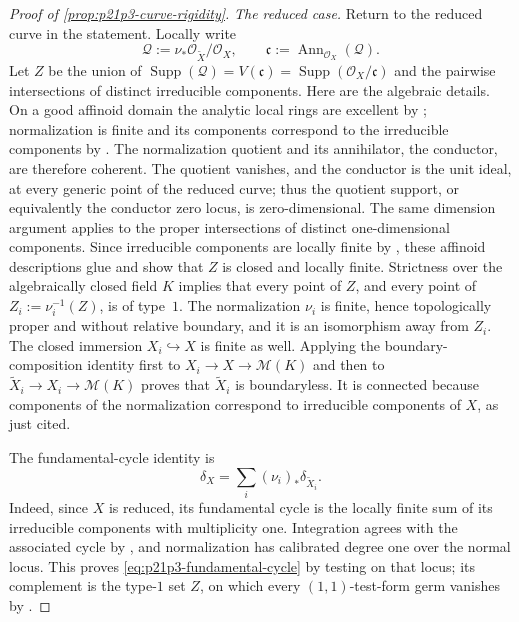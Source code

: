 \begin{proof}[Proof of \cref{prop:p21p3-curve-rigidity}]
\smallskip
\emph{The reduced case.}
Return to the reduced curve in the statement.  Locally write
\[
 \mathcal Q:=\nu_*\mathcal O_{\widetilde X}/\mathcal O_X,
 \qquad
 \mathfrak c:=\operatorname{Ann}_{\mathcal O_X}(\mathcal Q).
\]
Let \(Z\) be the union of
\(\operatorname{Supp}(\mathcal Q)=V(\mathfrak c)
=\operatorname{Supp}(\mathcal O_X/\mathfrak c)\) and the pairwise
intersections of distinct irreducible components.  Here are the algebraic
details.  On a good affinoid domain the analytic local rings are excellent
by \cite[\S11.1.10]{CLD25}; normalization is finite and its components
correspond to the irreducible components by
\cite[\S11.3.1]{CLD25}.  The normalization quotient and its annihilator,
the conductor, are therefore coherent.  The quotient vanishes, and the
conductor is the unit ideal, at every generic point of the reduced curve;
thus the quotient support, or equivalently the conductor zero locus, is
zero-dimensional.  The
same dimension argument applies to the proper intersections of distinct
one-dimensional components.  Since irreducible components are locally
finite by \cite[\S11.2.5]{CLD25}, these affinoid descriptions glue and
show that \(Z\) is closed and locally finite.  Strictness over the
algebraically closed field \(K\) implies that every point of \(Z\), and
every point of
\(
 Z_i:=\nu_i^{-1}(Z)
\), is of type~$1$.  The normalization \(\nu_i\) is finite, hence
topologically proper and without relative boundary, and it is an
isomorphism away from \(Z_i\).  The closed immersion \(X_i\hookrightarrow
X\) is finite as well.  Applying the boundary-composition identity
\cite[(11.4.1.3)]{CLD25} first to \(X_i\to X\to\mathcal M(K)\) and then to
\(\widetilde X_i\to X_i\to\mathcal M(K)\) proves that
\(\widetilde X_i\) is boundaryless.  It is connected because components
of the normalization correspond to irreducible components of \(X\), as
just cited.

The fundamental-cycle identity is
\begin{equation}
\label{eq:p21p3-fundamental-cycle}
             \delta_X=\sum_i(\nu_i)_*\delta_{\widetilde X_i}.
\end{equation}
Indeed, since \(X\) is reduced, its fundamental cycle is the locally
finite sum of its irreducible components with multiplicity one.
Integration agrees with the associated cycle by
\cite[Proposition~16.6.3]{CLD25}, and normalization has calibrated
degree one over the normal locus.  This proves
\eqref{eq:p21p3-fundamental-cycle} by testing on that locus; its
complement is the type-$1$ set \(Z\), on which every $(1,1)$-test-form
germ vanishes by \cite[Proposition~3.3.6]{CLD25}.


\end{proof}
